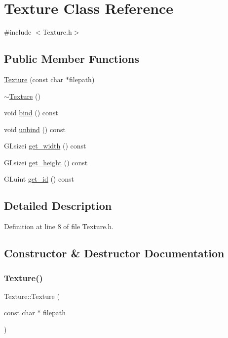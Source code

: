 \hypertarget{class_texture}{}\section{Texture Class Reference}
\label{class_texture}


{\ttfamily \#include $<$Texture.\+h$>$}

\subsection*{Public Member Functions}
\begin{DoxyCompactItemize}
\item 
\hyperlink{class_texture_ad5406229668e6ee741beddc3f37a38d1}{Texture} (const char $\ast$filepath)
\item 
\hyperlink{class_texture_a09c4bcb7462f64c1d20fa69dba3cee8a}{$\sim$\+Texture} ()
\item 
void \hyperlink{class_texture_a4b85391c6e54686ec566ba38c62dde98}{bind} () const
\item 
void \hyperlink{class_texture_a451d7afac3848417bb1007d39ee7d545}{unbind} () const
\item 
G\+Lsizei \hyperlink{class_texture_a29224e09dad7892ec84ea379703b512c}{get\+\_\+width} () const
\item 
G\+Lsizei \hyperlink{class_texture_afdc100805e42879c03439962c48f9dda}{get\+\_\+height} () const
\item 
G\+Luint \hyperlink{class_texture_a53aa350bde0fc93271c74e2bd2b391fa}{get\+\_\+id} () const
\end{DoxyCompactItemize}


\subsection{Detailed Description}


Definition at line 8 of file Texture.\+h.



\subsection{Constructor \& Destructor Documentation}
\mbox{\label{class_texture_ad5406229668e6ee741beddc3f37a38d1}} 
\subsubsection{\texorpdfstring{Texture()}{Texture()}}
{\footnotesize\ttfamily Texture\+::\+Texture (\begin{DoxyParamCaption}\item[{const char $\ast$}]{filepath }\end{DoxyParamCaption})}



